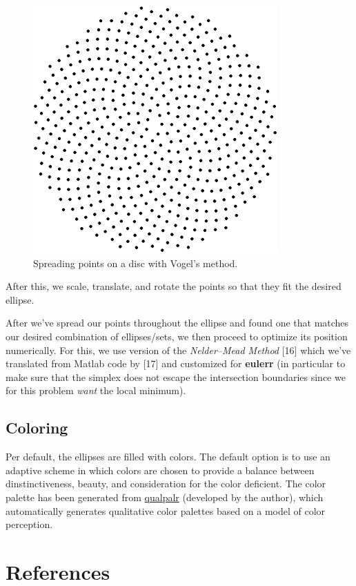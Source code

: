\documentclass[
  headsepline=true,headings=standardclasses%
]{scrartcl}
\theoremstyle{definition}
\theoremstyle{definition}
\theoremstyle{remark}
\begin{document}
\begin{figure}
\centering
\includegraphics{thesis_files/figure-latex/unnamed-chunk-12-1.pdf}
\caption{\label{fig:unnamed-chunk-12}Spreading points on a disc with Vogel's
method.}
\end{figure}

After this, we scale, translate, and rotate the points so that they fit
the desired ellipse.

After we've spread our points throughout the ellipse and found one that
matches our desired combination of ellipses/sets, we then proceed to
optimize its position numerically. For this, we use version of the
\emph{Nelder--Mead Method} {[}16{]} which we've translated from Matlab
code by {[}17{]} and customized for \textbf{eulerr} (in particular to
make sure that the simplex does not escape the intersection boundaries
since we for this problem \emph{want} the local minimum).

\subsection{Coloring}\label{coloring}

Per default, the ellipses are filled with colors. The default option is
to use an adaptive scheme in which colors are chosen to provide a
balance between dinstinctiveness, beauty, and consideration for the
color deficient. The color palette has been generated from
\href{https://CRAN.R-project.org/package=qualpalr}{qualpalr} (developed
by the author), which automatically generates qualitative color palettes
based on a model of color perception.

\section*{References}\label{references}
\end{document}
